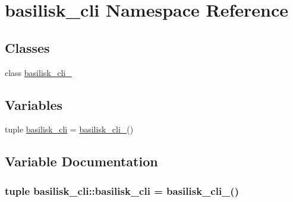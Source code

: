 \hypertarget{namespacebasilisk__cli}{\section{basilisk\-\_\-cli \-Namespace \-Reference}
\label{namespacebasilisk__cli}
}
\subsection*{\-Classes}
\begin{DoxyCompactItemize}
\item 
class \hyperlink{classbasilisk__cli_1_1basilisk__cli__}{basilisk\-\_\-cli\-\_\-}
\end{DoxyCompactItemize}
\subsection*{\-Variables}
\begin{DoxyCompactItemize}
\item 
tuple \hyperlink{namespacebasilisk__cli_a64228cb9d5a38d97874700ad7400792b}{basilisk\-\_\-cli} = \hyperlink{classbasilisk__cli_1_1basilisk__cli__}{basilisk\-\_\-cli\-\_\-}()
\end{DoxyCompactItemize}


\subsection{\-Variable \-Documentation}
\hypertarget{namespacebasilisk__cli_a64228cb9d5a38d97874700ad7400792b}{
\subsubsection[{basilisk\-\_\-cli}]{\setlength{\rightskip}{0pt plus 5cm}tuple {\bf basilisk\-\_\-cli\-::basilisk\-\_\-cli} = {\bf basilisk\-\_\-cli\-\_\-}()}}\label{namespacebasilisk__cli_a64228cb9d5a38d97874700ad7400792b}
